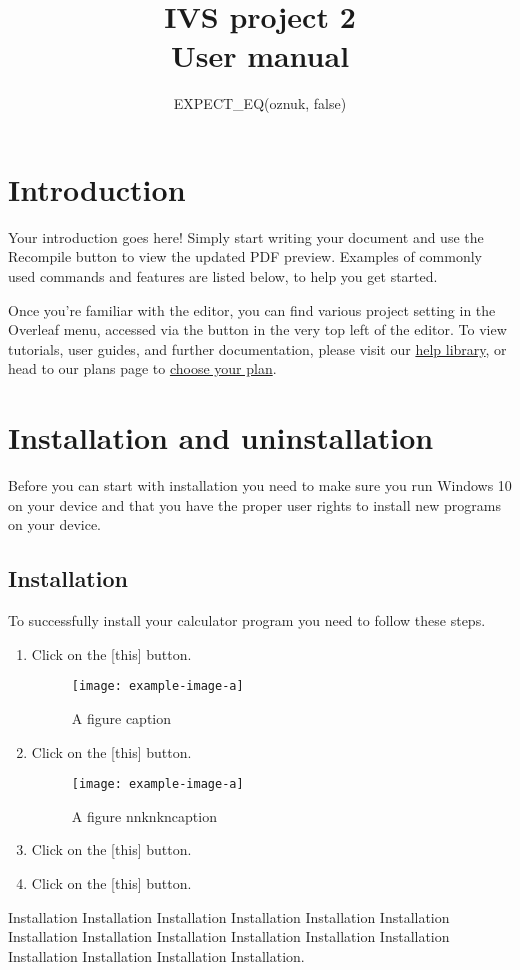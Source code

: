 \documentclass{article}
\title{IVS project 2\\User manual}
\author{EXPECT\_EQ(oznuk, false)}
\begin{document}
\maketitle


\section{Introduction}

Your introduction goes here! Simply start writing your document and use the Recompile button to view the updated PDF preview. Examples of commonly used commands and features are listed below, to help you get started.

Once you're familiar with the editor, you can find various project setting in the Overleaf menu, accessed via the button in the very top left of the editor. To view tutorials, user guides, and further documentation, please visit our \href{https://www.overleaf.com/learn}{help library}, or head to our plans page to \href{https://www.overleaf.com/user/subscription/plans}{choose your plan}.


\section{Installation and uninstallation}
Before you can start with installation you need to make sure you run Windows 10 on your device and that you have the proper user rights to install new programs on your device. 

\subsection{Installation}
To successfully install your calculator program you need to follow these steps.

\begin{enumerate}
\item Click on the [this] button.
  \begin{figure}[H]
    \centering
    \texttt{[image: example-image-a]}
    \caption{A figure caption}
  \end{figure}
  
\item Click on the [this] button.
  \begin{figure}[H]
    \centering
    \texttt{[image: example-image-a]}
    \caption{A figure     nnknkncaption}
  \end{figure}

\item Click on the [this] button.
\item Click on the [this] button.


\end{enumerate}
Installation Installation Installation Installation Installation Installation Installation Installation Installation Installation Installation Installation Installation Installation Installation Installation.
\end{document}
